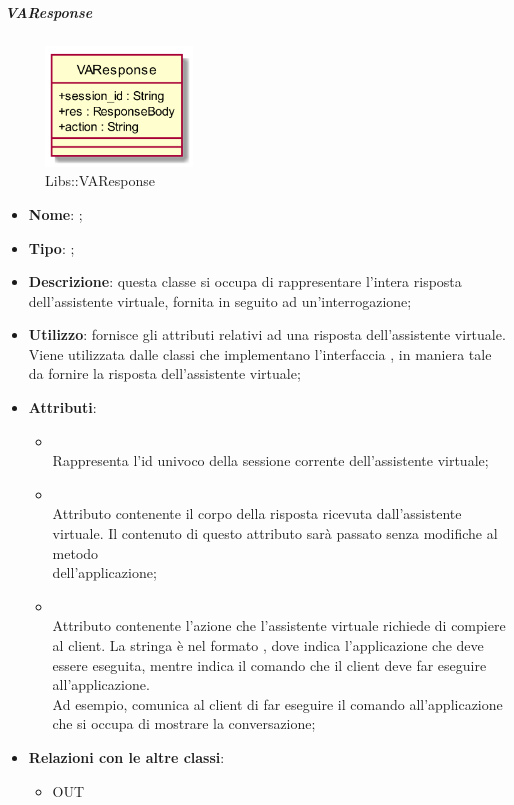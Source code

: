 \hypertarget{VAResponse_label}{\subparagraph{VAResponse}}
\begin{figure}[h]
	\centering
	\includegraphics[width=0.35\textwidth,height=\textheight,keepaspectratio]{images/ClassVAResponse.png}
	\caption{Libs::VAResponse}
\end{figure}
\begin{itemize}
	\item \textbf{Nome}: ;
	\item \textbf{Tipo}: ;
	\item \textbf{Descrizione}: questa classe si occupa di rappresentare l'intera risposta dell'assistente virtuale, fornita in seguito ad un'interrogazione;
	\item \textbf{Utilizzo}: fornisce gli attributi relativi ad una risposta dell'assistente virtuale. Viene utilizzata dalle classi che implementano l'interfaccia , in maniera tale da fornire la risposta dell'assistente virtuale;
	\item \textbf{Attributi}:
	\begin{itemize}
		\item[]  \\
		Rappresenta l'id univoco della sessione corrente dell'assistente virtuale;
		\item[]  \\
		Attributo contenente il corpo della risposta ricevuta dall'assistente virtuale. Il contenuto di questo attributo sarà passato senza modifiche al metodo \\  dell'applicazione;
		\item[]  \\
		Attributo contenente l'azione che l'assistente virtuale richiede di compiere al client. La stringa è nel formato , dove  indica l'applicazione che deve essere eseguita, mentre  indica il comando che il client deve far eseguire all'applicazione. \\
		Ad esempio,  comunica al client di far eseguire il comando  all'applicazione che si occupa di mostrare la conversazione;
	\end{itemize}
	\item \textbf{Relazioni con le altre classi}:
	\begin{itemize}
		\item OUT \hyperlink{ResponseBody_label}{}
	\end{itemize}
\end{itemize}
\FloatBarrier
